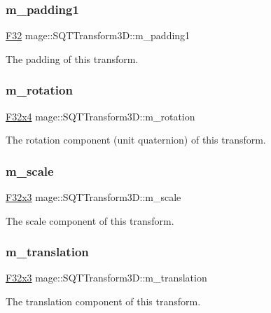 \subsubsection{\texorpdfstring{m\+\_\+padding1}{m\_padding1}}
{\footnotesize\ttfamily \mbox{\hyperlink{namespacemage_aa97e833b45f06d60a0a9c4fc22ae02c0}{F32}} mage\+::\+S\+Q\+T\+Transform3\+D\+::m\+\_\+padding1\hspace{0.3cm}{\ttfamily [private]}}

The padding of this transform. \mbox{\label{classmage_1_1_s_q_t_transform3_d_a06b518d122471db76e721216d3a3ecea}} 
\subsubsection{\texorpdfstring{m\+\_\+rotation}{m\_rotation}}
{\footnotesize\ttfamily \mbox{\hyperlink{namespacemage_a851648f37dfb126a2d2f973e102861ad}{F32x4}} mage\+::\+S\+Q\+T\+Transform3\+D\+::m\+\_\+rotation\hspace{0.3cm}{\ttfamily [private]}}

The rotation component (unit quaternion) of this transform. \mbox{\label{classmage_1_1_s_q_t_transform3_d_a7bf284ec5bd7738804f9e2018909280e}} 
\subsubsection{\texorpdfstring{m\+\_\+scale}{m\_scale}}
{\footnotesize\ttfamily \mbox{\hyperlink{namespacemage_a1e3c7a882af461f161caa1cbddaf1fa2}{F32x3}} mage\+::\+S\+Q\+T\+Transform3\+D\+::m\+\_\+scale\hspace{0.3cm}{\ttfamily [private]}}

The scale component of this transform. \mbox{\label{classmage_1_1_s_q_t_transform3_d_a41257624928becdfdec6284e75eb8605}} 
\subsubsection{\texorpdfstring{m\+\_\+translation}{m\_translation}}
{\footnotesize\ttfamily \mbox{\hyperlink{namespacemage_a1e3c7a882af461f161caa1cbddaf1fa2}{F32x3}} mage\+::\+S\+Q\+T\+Transform3\+D\+::m\+\_\+translation\hspace{0.3cm}{\ttfamily [private]}}

The translation component of this transform. 